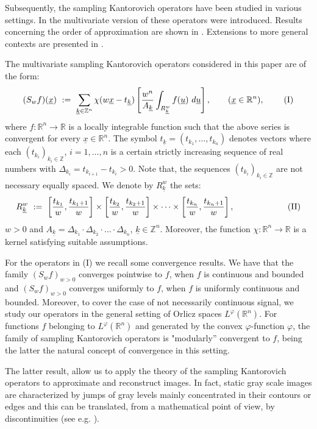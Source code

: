 \documentclass[11pt,a4paper]{article}
\newcommand{\R}{\mathbb{R}}
\newcommand{\Z}{\mathbb{Z}}
\begin{document}
   Subsequently, the sampling Kantorovich operators have been studied in various settings. In \cite{COVI,COVI2} the multivariate version of these operators were introduced. Results concerning the order of approximation are shown in \cite{COVI3}. Extensions to more general contexts are presented in \cite{VIZA1,VIZA2,VIZA3,BAMA2}.

   The multivariate sampling Kantorovich operators considered in this paper are of the form:
$$
(S_w f)(\underline{x})\ :=\ \sum_{\underline{k} \in \Z^n} \chi(w\underline{x}-t_{\underline{k}})\left[\frac{w^n}{A_{\underline{k}}} \int_{R_{\underline{k}}^w}f(\underline{u})\ d\underline{u}\right], \hskip0.7cm (\underline{x} \in \R^n), \hskip0.8cm \mbox{(I)}
$$
where $f: \R^n \to \R$ is a locally integrable function such that the above series is convergent for every $\underline{x} \in \R^n$. The symbol $t_{\underline{k}}=\left(t_{k_1},\dots,t_{k_n}\right)$ denotes vectors where each $(t_{k_i})_{k_i \in \Z}$, $i=1,\dots,n$ is a certain strictly increasing sequence of real numbers with $\Delta_{k_i}=t_{k_{i+1}}-t_{k_i}>0$.
Note that, the sequences $(t_{k_i})_{k_i \in \Z}$ are not necessary equally spaced. We denote by $R_{\underline{k}}^w$ the sets:
$$
R_{\underline{k}}^w\ :=\ \left[\frac{t_{k_1}}{w},\frac{t_{k_1+1}}{w}\right]\times\left[\frac{t_{k_2}}{w},\frac{t_{k_2+1}}{w}\right]\times\dots \times\left[\frac{t_{k_n}}{w},\frac{t_{k_n+1}}{w}\right], \hskip2.2cm \mbox{(II)}
$$
$w>0$ and $A_{\underline{k}} = \Delta_{k_1} \cdot \Delta_{k_2} \cdot\dots \cdot \Delta_{k_n}$, $\underline{k} \in \Z^n$. Moreover, the function $\chi:\R^n \to \R$ is a kernel satisfying suitable assumptions. 

   For the operators in (I) we recall some convergence results. We have that the family $(S_wf)_{w>0}$ converges pointwise to $f$, when $f$ is continuous and bounded and $(S_w f)_{w>0}$ converges uniformly to $f$, when $f$ is uniformly continuous and bounded. Moreover, to cover the case of not necessarily continuous signal, we study our operators in the general setting of Orlicz spaces $L^{\varphi}(\R^n)$. For functions $f$ belonging to $L^{\varphi}(\R^n)$ and generated by the convex $\varphi$-function $\varphi$, the family of sampling Kantorovich operators is "modularly'' convergent to $f$, being the latter the natural concept of convergence in this setting.  

   The latter result, allow us to apply the theory of the sampling Kantorovich operators to approximate and reconstruct images. In fact, static gray scale images are characterized by jumps of gray levels mainly concentrated in their contours or edges and this can be translated, from a mathematical point of view, by discontinuities (see e.g. \cite{GOWO}).
\end{document}
